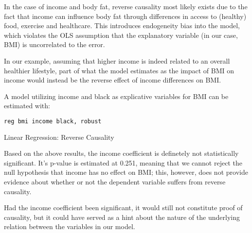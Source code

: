 

In the case of income and body fat, reverse causality most likely exists due to the fact that income can influence body fat through differences in access to (healthy) food, exercise and healthcare. This introduces endogeneity bias into the model, which violates the OLS assumption that the explanatory variable (in our case, BMI) is uncorrelated to the error.

In our example, assuming that higher income is indeed related to an overall healthier lifestyle, part of what the model estimates as the impact of BMI on income would instead be the reverse effect of income differences on BMI.


\newpage

A model utilizing income and black as explicative variables for BMI can be estimated with:

\begin{verbatim}
reg bmi income black, robust
\end{verbatim}

\begin{table}[H]
    \begin{center}
        \caption{Linear Regression: Reverse Causality}
        
        \label{tab:reg7}    
    \end{center}
\end{table}


Based on the above results, the income coefficient is definetely not statistically significant. It's p-value is estimated at 0.251, meaning that we cannot reject the null hypothesis that income has no effect on BMI; this, however, does not provide evidence about whether or not the dependent variable suffers from reverse causality.

Had the income coefficient been significant, it would still not constitute proof of causality, but it could have served as a hint about the nature of the underlying relation between the variables in our model.